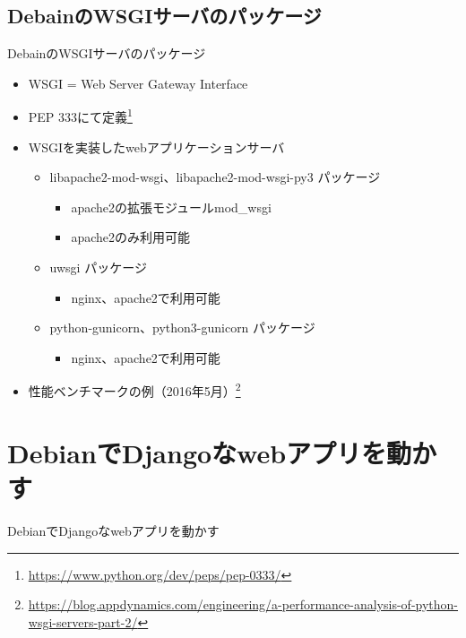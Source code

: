 \subsection{DebainのWSGIサーバのパッケージ}

\begin{frame}{DebainのWSGIサーバのパッケージ}%
  
\begin{itemize}
\item WSGI = Web Server Gateway Interface
\item PEP 333にて定義\footnote{\url{https://www.python.org/dev/peps/pep-0333/}}
\item WSGIを実装したwebアプリケーションサーバ
  \begin{itemize}
  \item libapache2-mod-wsgi、libapache2-mod-wsgi-py3 パッケージ
    \begin{itemize}
    \item apache2の拡張モジュールmod\_wsgi
    \item apache2のみ利用可能
    \end{itemize}
  \item uwsgi パッケージ
    \begin{itemize}
    \item nginx、apache2で利用可能
    \end{itemize}
  \item python-gunicorn、python3-gunicorn パッケージ
    \begin{itemize}
    \item nginx、apache2で利用可能
    \end{itemize}
  \end{itemize}
\item 性能ベンチマークの例（2016年5月）\footnote{\url{https://blog.appdynamics.com/engineering/a-performance-analysis-of-python-wsgi-servers-part-2/}}
\end{itemize}

\end{frame}


\section{DebianでDjangoなwebアプリを動かす}

\begin{frame}
  \begin{center}\Huge{DebianでDjangoなwebアプリを動かす}\end{center}
\end{frame}


